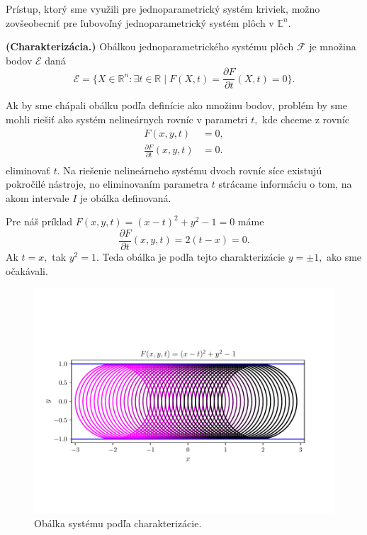 Prístup, ktorý sme využili pre jednoparametrický systém kriviek, možno zovšeobecniť pre ľubovoľný jednoparametrický systém plôch v $\mathbb{E}^n.$

\begin{definition}{\textbf{\textup{(Charakterizácia.)}}}
\label{charakterizacia}
Obálkou jednoparametrického systému plôch $ \mathcal{F} $ je množina bodov $\mathcal{E}$ daná
$$\mathcal{E} = \{ X \in \mathbb{R}^{n} \colon \exists t \in \mathbb{R} \mid F(X, t) = \frac{\partial F}{\partial t}(X, t) = 0 \}.$$
\end{definition}

Ak by sme chápali obálku podľa definície ako množinu bodov, problém by sme mohli riešiť ako systém nelineárnych rovníc v parametri $t,$ kde chceme z rovníc 
\begin{align*}
F(x,y,t) &= 0, \\
\frac{\partial F}{\partial t}(x, y, t) &= 0. \\
\end{align*}
eliminovať $t.$ Na riešenie nelineárneho systému dvoch rovníc síce existujú pokročilé nástroje, no eliminovaním parametra $t$ strácame informáciu o tom, na akom intervale $I$ je obálka definovaná. 

\begin{example}
Pre náš príklad $ F(x, y, t) = (x - t)^2 + y^2 - 1 = 0 $ máme 
$$\frac{\partial F}{\partial t}(x, y, t) = 2(t-x) = 0. $$
Ak $t = x, $ tak $y^2 = 1.$ Teda obálka je podľa tejto charakterizácie $ y = \pm 1, $ ako sme očakávali.
\end{example}

\begin{figure}[h]
	\centering
	\includegraphics[trim={0 1.65cm 0 2cm},clip]{images/system_with_envelope_unlimited_domain.pdf}
	\caption{Obálka systému podľa charakterizácie.}
	\label{fig:system_with_envelope_unlimited_domain}
\end{figure}

